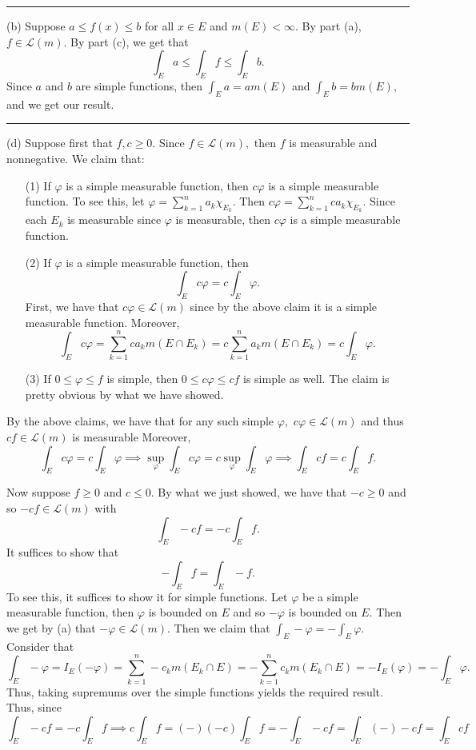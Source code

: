 \documentclass[11pt]{article}
\begin{document}
\begin{solution}
\rule{\linewidth}{0.4pt}

(b) Suppose $a\leq f(x) \leq b$ for all $x \in E$ and $m(E) < \infty.$ By part (a), $f \in \mathcal{L}(m).$ By part (c), we get that 
\[\int_E a \leq \int_E f \leq \int_E b.\] Since $a$ and $b$ are simple functions, then $\int_E a = a m(E)$ and $\int_E b = bm(E),$ and we get our result.

\rule{\linewidth}{0.4pt}

(d) Suppose first that $f, c \geq 0.$ Since $f \in \mathcal{L}(m),$ then $f$ is measurable and nonnegative. We claim that: 
\begin{enumerate}
    \item [(1)] If $\varphi$ is a simple measurable function, then $c \varphi$ is a simple measurable function. To see this, let $\varphi = \sum_{k=1}^n a_k \chi_{E_k}.$ Then $c \varphi = \sum_{k=1}^n ca_k \chi_{E_k}.$ Since each $E_k$ is measurable since $\varphi$ is measurable, then $c\varphi$ is a simple measurable function.
    \item [(2)] If $\varphi$ is a simple measurable function, then 
    \[\int_E c \varphi = c \int_E \varphi.\] First, we have that $c \varphi \in \mathcal{L}(m)$ since by the above claim it is a simple measurable function. Moreover, 
    \[\int_E c\varphi = \sum_{k=1}^n ca_k m(E \cap E_k) = c\sum_{k=1}^n a_k m(E \cap E_k) = c\int_E \varphi.\]
    \item [(3)] If $0\leq \varphi\leq f$ is simple, then $0\leq c\varphi \leq cf$ is simple as well. The claim is pretty obvious by what we have showed. 
\end{enumerate}
By the above claims, we have that for any such simple $\varphi,$ $c\varphi \in \mathcal{L}(m)$ and thus $cf \in \mathcal{L}(m)$ is measurable Moreover,
\[\int_E c\varphi = c\int_E \varphi \implies \sup_{\varphi}\int_E c\varphi  =  c\sup_{\varphi} \int_E \varphi  \implies \int_E cf  = c\int_E f.\]


Now suppose $f\geq 0$ and $c \leq 0.$ By what we just showed,  we have that $-c \geq 0$ and so $-cf \in \mathcal{L}(m)$ with 
\[\int_E -cf = -c\int_E f.\] It suffices to show that \[-\int_E f = \int_E -f.\] To see this, it suffices to show it for simple functions. Let $\varphi$ be a simple measurable function, then $\varphi$ is bounded on $E$ and so $-\varphi$ is bounded on $E.$ Then we get by (a) that $-\varphi \in \mathcal{L}(m).$ Then we claim that $\int_E -\varphi = -\int_E \varphi.$ Consider that 
\[\int_E -\varphi = I_E(-\varphi ) = \sum_{k=1}^n -c_k m(E_k \cap E) = -\sum_{k=1}^n c_k m(E_k \cap E) = -I_E(\varphi) = -\int_E \varphi.\] Thus, taking supremums over the simple functions yields the required result. Thus, since 
\[\int_E -cf = -c \int_E f \implies c\int_E f = (-)(-c)\int_E f = -\int_E -cf = \int_E (-)-cf = \int_E cf \]


\end{solution}
\end{document}
